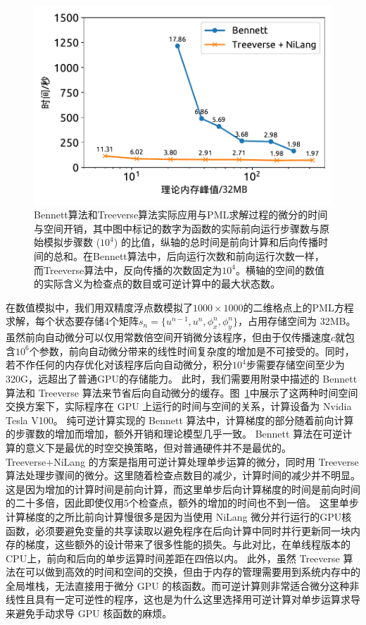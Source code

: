 \documentclass[A4,twoside,UTF8]{ctexart}
\begin{document}
\begin{figure}[t]
\centering
\includegraphics[width=0.6\columnwidth]{./fig5.pdf}
    \caption{Bennett算法和Treeverse算法实际应用与PML求解过程的微分的时间与空间开销，其中图中标记的数字为函数的实际前向运行步骤数与原始模拟步骤数 ($10^4$) 的比值，纵轴的总时间是前向计算和后向传播时间的总和。在Bennett算法中，后向运行次数和前向运行次数一样，而Treeverse算法中，反向传播的次数固定为$10^4$。横轴的空间的数值的实际含义为检查点的数目或可逆计算中的最大状态数。\label{fig:seismic}}
\end{figure}

在数值模拟中，我们用双精度浮点数模拟了$1000 \times 1000$的二维格点上的PML方程求解，每个状态要存储4个矩阵$s_n = \{u^{n-1}, u^n, \phi_x^n, \phi_y^n\}$，占用存储空间为 32MB。
虽然前向自动微分可以仅用常数倍空间开销微分该程序，但由于仅传播速度$c$就包含$10^6$个参数，前向自动微分带来的线性时间复杂度的增加是不可接受的。同时，若不作任何的内存优化对该程序后向自动微分，积分$10^4$步需要存储空间至少为320G，远超出了普通GPU的存储能力。
此时，我们需要用附录中描述的 Bennett 算法和 Treeverse 算法来节省后向自动微分的缓存。图~\ref{fig:seismic}中展示了这两种时间空间交换方案下，实际程序在 GPU 上运行的时间与空间的关系，计算设备为 Nvidia Tesla V100。
纯可逆计算实现的 Bennett 算法中，计算梯度的部分随着前向计算的步骤数的增加而增加，额外开销和理论模型几乎一致。
Bennett 算法在可逆计算的意义下是最优的时空交换策略，但对普通硬件并不是最优的。
Treeverse+NiLang 的方案是指用可逆计算处理单步运算的微分，同时用 Treeverse 算法处理步骤间的微分。这里随着检查点数目的减少，计算时间的减少并不明显。这是因为增加的计算时间是前向计算，而这里单步后向计算梯度的时间是前向时间的二十多倍，因此即使仅用5个检查点，额外的增加的时间也不到一倍。
这里单步计算梯度的之所比前向计算慢很多是因为当使用 NiLang 微分并行运行的GPU核函数，必须要避免变量的共享读取以避免程序在后向计算中同时并行更新同一块内存的梯度，这些额外的设计带来了很多性能的损失。与此对比，在单线程版本的CPU上，前向和后向的单步运算时间差距在四倍以内。
此外，虽然 Treeverse 算法在可以做到高效的时间和空间的交换，但由于内存的管理需要用到系统内存中的全局堆栈，无法直接用于微分 GPU 的核函数。而可逆计算则非常适合微分这种非线性且具有一定可逆性的程序，这也是为什么这里选择用可逆计算对单步运算求导来避免手动求导 GPU 核函数的麻烦。
\end{document}
